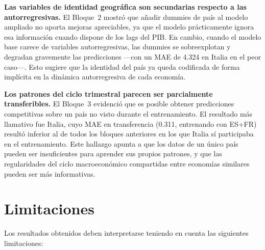 \textbf{Las variables de identidad geográfica son secundarias respecto a las
autorregresivas.} El Bloque~2 mostró que añadir dummies de país al modelo ampliado no
aporta mejoras apreciables, ya que el modelo prácticamente ignora esa información cuando
dispone de los lags del PIB. En cambio, cuando el modelo base carece de variables
autorregresivas, las dummies se sobreexplotan y degradan gravemente las predicciones ---con
un MAE de 4.324 en Italia en el peor caso---. Esto sugiere que la identidad del país ya
queda codificada de forma implícita en la dinámica autorregresiva de cada economía.

\textbf{Los patrones del ciclo trimestral parecen ser parcialmente transferibles.} El
Bloque~3 evidenció que es posible obtener predicciones competitivas sobre un país no
visto durante el entrenamiento. El resultado más llamativo fue Italia, cuyo MAE en
transferencia (0.311, entrenando con ES+FR) resultó inferior al de todos los bloques
anteriores en los que Italia sí participaba en el entrenamiento. Este hallazgo apunta a
que los datos de un único país pueden ser insuficientes para aprender sus propios patrones,
y que las regularidades del ciclo macroeconómico compartidas entre economías similares
pueden ser más informativas.

\section{Limitaciones}

Los resultados obtenidos deben interpretarse teniendo en cuenta las siguientes
limitaciones:

